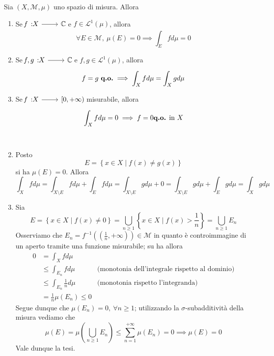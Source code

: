 \begin{property}
Sia $\left(X,\mathcal{M},\mu\right)$ uno spazio di misura. Allora
\begin{enumerate}
	\item Se $\funz{f}{X}{\complexset}$ e $f\in\mathcal{L}^{1}\left(\mu\right)$, allora
	\begin{equation}
		\forall E\in\mathcal{M},\ \mu\left(E\right)=0\implies \int_Efd\mu=0
	\end{equation}
\item Se $\funz{f,g}{X}{\complexset}$ e $f,g\in\mathcal{L}^{1}\left(\mu\right)$, allora
\begin{equation}
	f=g\ \text{\textbf{q.o.}}\implies \int_Xfd\mu=\int_Xgd\mu
\end{equation}
\item Se $\funz{f}{X}{\left[0,+\infty\right)}$ misurabile, allora
\begin{equation}
	\int_X fd\mu=0\implies f=0 \text{\textbf{q.o.} in }X
\end{equation}
\end{enumerate}
\end{property}
\begin{demonstration}~{}
	\begin{enumerate}[label=\Roman*]
		\setcounter{enumi}{1}
		\item Posto
		\begin{equation*}
			E=\left\{x\in X\mid f\left(x\right)\neq g\left(x\right)\right\}
		\end{equation*}
	si ha $\mu\left(E\right)=0$. Allora
	\begin{equation*}
		\int_Xfd\mu=\int_{X\setminus E}fd\mu+\int_Efd\mu=\int_{X\setminus E}gd\mu+0=\int_{X\setminus E}gd\mu+\int_Egd\mu=\int_Xgd\mu
	\end{equation*}
	\item Sia
		\begin{equation*}
			E=\left\{x\in X\mid f\left(x\right)\neq 0\right\}=\bigcup_{n\geq 1}\left\{x\in X\mid f\left(x\right)>\frac{1}{n}\right\}=\bigcup_{n\geq 1}E_n
		\end{equation*}
	Osserviamo che $E_n=f^{-1}\left(\left(\frac{1}{n},+\infty\right)\right)\in\mathcal{M}$ in quanto è controimmagine di un aperto tramite una funzione misurabile; su ha allora
	\begin{align*}
		0&=\int_Xfd\mu&\\
		 &\leq\int_{E_n}fd\mu&\text{(monotonia dell'integrale rispetto al dominio)}\\
		 &\leq\int_{E_n}\frac{1}{n}d\mu&\text{(monotonia rispetto l'integranda)}\\
		 &=\frac{1}{n}\mu\left(E_n\right)\leq 0&
	\end{align*}
	Segue dunque che $\mu\left(E_n\right)=0,\ \forall n\geq 1$; utilizzando la $\sigma$-subadditività della misura vediamo che
	\begin{equation*}
		\mu\left(E\right)=\mu\left(\bigcup_{n\geq 1}E_n\right)\leq\sum_{n=1}^{+\infty}\mu\left(E_n\right)=0\implies \mu\left(E\right)=0
	\end{equation*}
	Vale dunque la tesi.\qedhere
	\end{enumerate}
\end{demonstration}
